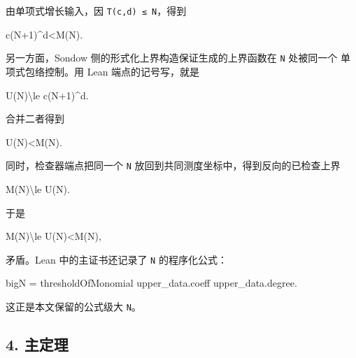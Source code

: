 \documentclass[
  a4paper,
  12pt]{ctexart}
\newenvironment{Shaded}{}{}
\newcommand{\NormalTok}[1]{#1}
\begin{document}
由单项式增长输入，因 \texttt{T(c,d)\ ≤\ N}，得到

\begin{Shaded}
\begin{Highlighting}[]
\NormalTok{c(N+1)\^{}d\textless{}M(N).}
\end{Highlighting}
\end{Shaded}

另一方面，Sondow 侧的形式化上界构造保证生成的上界函数在 \texttt{N}
处被同一个 单项式包络控制。用 Lean 端点的记号写，就是

\begin{Shaded}
\begin{Highlighting}[]
\NormalTok{U(N)\textbackslash{}le c(N+1)\^{}d.}
\end{Highlighting}
\end{Shaded}

合并二者得到

\begin{Shaded}
\begin{Highlighting}[]
\NormalTok{U(N)\textless{}M(N).}
\end{Highlighting}
\end{Shaded}

同时，检查器端点把同一个 \texttt{N}
放回到共同测度坐标中，得到反向的已检查上界

\begin{Shaded}
\begin{Highlighting}[]
\NormalTok{M(N)\textbackslash{}le U(N).}
\end{Highlighting}
\end{Shaded}

于是

\begin{Shaded}
\begin{Highlighting}[]
\NormalTok{M(N)\textbackslash{}le U(N)\textless{}M(N),}
\end{Highlighting}
\end{Shaded}

矛盾。Lean 中的主证书还记录了 \texttt{N} 的程序化公式：

\begin{Shaded}
\begin{Highlighting}[]
\NormalTok{bigN = thresholdOfMonomial upper\_data.coeff upper\_data.degree.}
\end{Highlighting}
\end{Shaded}

这正是本文保留的公式级大 \texttt{N}。

\subsection{4. 主定理}\label{ux4e3bux5b9aux7406}
\end{document}
